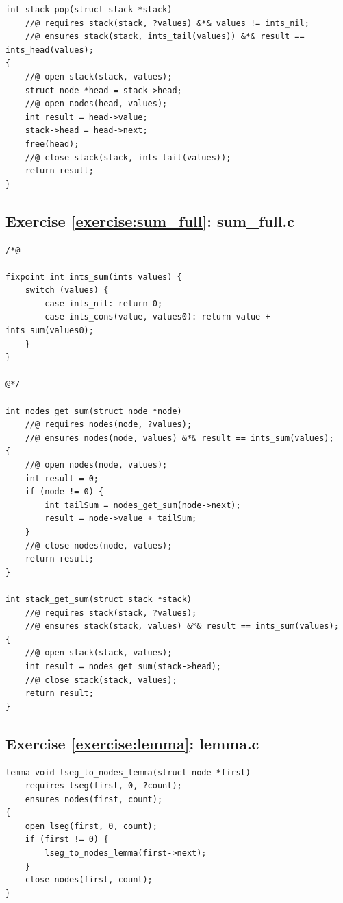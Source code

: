 \documentclass{article}
\begin{document}
\begin{lstlisting}
int stack_pop(struct stack *stack)
    //@ requires stack(stack, ?values) &*& values != ints_nil;
    //@ ensures stack(stack, ints_tail(values)) &*& result == ints_head(values);
{
    //@ open stack(stack, values);
    struct node *head = stack->head;
    //@ open nodes(head, values);
    int result = head->value;
    stack->head = head->next;
    free(head);
    //@ close stack(stack, ints_tail(values));
    return result;
}
\end{lstlisting}

\subsection{Exercise
\ref{exercise:sum_full}: sum\_full.c}\label{solution:sum_full}

\begin{lstlisting}
/*@

fixpoint int ints_sum(ints values) {
    switch (values) {
        case ints_nil: return 0;
        case ints_cons(value, values0): return value + ints_sum(values0);
    }
}

@*/

int nodes_get_sum(struct node *node)
    //@ requires nodes(node, ?values);
    //@ ensures nodes(node, values) &*& result == ints_sum(values);
{
    //@ open nodes(node, values);
    int result = 0;
    if (node != 0) {
        int tailSum = nodes_get_sum(node->next);
        result = node->value + tailSum;
    }
    //@ close nodes(node, values);
    return result;
}

int stack_get_sum(struct stack *stack)
    //@ requires stack(stack, ?values);
    //@ ensures stack(stack, values) &*& result == ints_sum(values);
{
    //@ open stack(stack, values);
    int result = nodes_get_sum(stack->head);
    //@ close stack(stack, values);
    return result;
}
\end{lstlisting}

\subsection{Exercise
\ref{exercise:lemma}: lemma.c}\label{solution:lemma}

\begin{lstlisting}
lemma void lseg_to_nodes_lemma(struct node *first)
    requires lseg(first, 0, ?count);
    ensures nodes(first, count);
{
    open lseg(first, 0, count);
    if (first != 0) {
        lseg_to_nodes_lemma(first->next);
    }
    close nodes(first, count);
}
\end{lstlisting}
\end{document}
